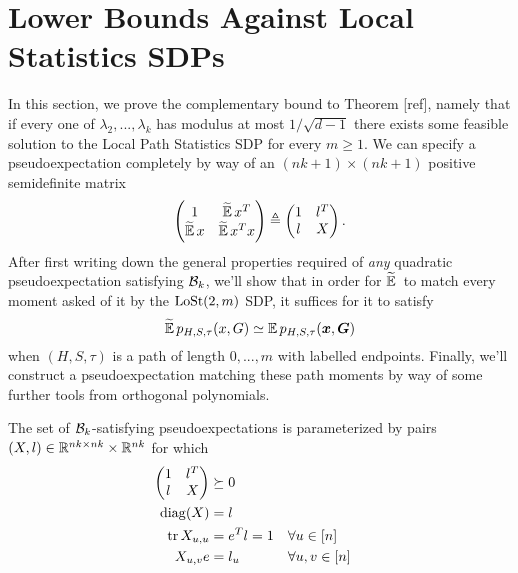 \section{Lower Bounds Against Local Statistics SDPs}
\label{sec:lower bound}

In this section, we prove the complementary bound to Theorem [ref], namely that if every one of $\lambda_2,...,\lambda_k$ has modulus at most $1/\sqrt{d-1}$ there exists some feasible solution to the Local Path Statistics SDP for every $m \ge 1$. We can specify a pseudoexpectation completely by way of an $(nk + 1)\times(nk+1)$ positive semidefinite matrix
$$
   \begin{pmatrix} 1 & \widetilde{\operatorname*{\mathbb{E}}}\, x^T \\ \widetilde{\operatorname*{\mathbb{E}}}\, x & \widetilde{\operatorname*{\mathbb{E}}}\, x^Tx \end{pmatrix} 
    \triangleq \begin{pmatrix} 1 & l^T \\ l & X \end{pmatrix}.
$$
After first writing down the general properties required of \textit{any} quadratic pseudoexpectation satisfying $\mathcal{B}_k$, we'll show that in order for $\widetilde{\operatorname*{\mathbb{E}}}\,$ to match every moment asked of it by the $\operatorname{LoSt}(2,m)$ SDP, it suffices for it to satisfy
$$
    \widetilde{\operatorname*{\mathbb{E}}}\, p_{H,S,\tau}(x,G) \simeq \operatorname*{\mathbb{E}} p_{H,S,\tau}({\boldsymbol{x}},\boldsymbol{G})
$$
when $(H,S,\tau)$ is a path of length $0,...,m$ with labelled endpoints. Finally, we'll construct a pseudoexpectation matching these path moments by way of some further tools from orthogonal polynomials.

\begin{lemma}
    The set of $\mathcal{B}_k$-satisfying pseudoexpectations is parameterized by pairs $(X,l) \in \mathbb{R}^{nk\times nk}\times \mathbb{R}^{nk}$ for which
    \begin{align}
        \begin{pmatrix} 1 & l^T \\ l& X \end{pmatrix} &\succeq 0 \\
        \operatorname{diag}(X) &= l \\
        \operatorname{tr} X_{u,u} &= e^T l = 1 & &\forall u\in[n]  \\
        X_{u,v}e &= l_u & &\forall u,v\in[n]
    \end{align}
\end{lemma}

